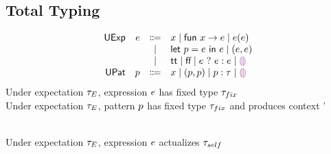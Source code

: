 \documentclass{article}
\begin{document}
\newpage


\subsection{Total Typing}
\[\begin{array}{rrcl}
  \EMName  & \EMV  & \Coloneqq & x \mid \EFun{x}{\EMV} \mid {\EMV}({\EMV}) \\
           &       & \mid         &
           \ELet{p}{\EMV}{\EMV} \mid
           \EPair{\EMV}{\EMV} \\
           &       & \mid         &
           \ETrue \mid
           \EFalse \mid
           \EIf{\EMV}{\EMV}{\EMV} \mid
           \EEHole \\
  \PMName  & \PMV  & \Coloneqq & x 
                     \mid           \EPair{\PMV}{\PMV}
                     \mid           \PMV : \TMV
                     \mid           \EEHole \\
\end{array}\]
%
 Under expectation $\TMV_{E}$, expression $\EMV$ has fixed type $\TMV_{fix}$
\\
 Under expectation $\TMV_{E}$, pattern $\PMV$ has fixed type $\TMV_{fix}$ and produces context {\ctx'}
\\
\begin{mathpar}


  
\end{mathpar}
\\
 Under expectation $\TMV_{E}$, expression $\EMV$ actualizes $\TMV_{self}$
%
\end{document}
